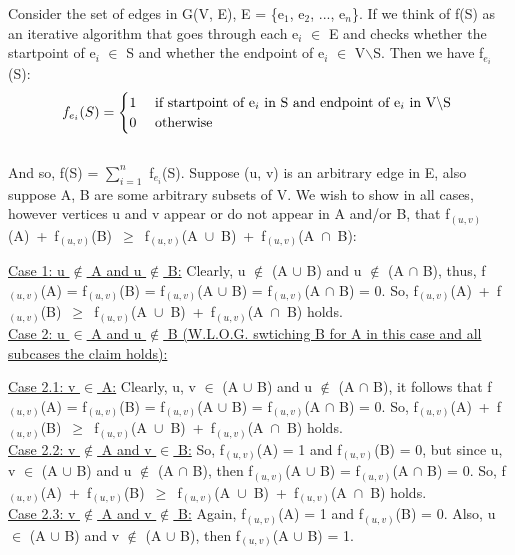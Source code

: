 \documentclass[10pt]{csc_assignment}
\begin{document}
\begin{description}
Consider the set of edges in G(V, E), E = \{e$_{1}$, e$_{2}$, ..., e$_{n}$\}. If we think of f(S) as an iterative algorithm that goes through each e$_{i}$ $\in$ E and checks whether the startpoint of e$_{i}$ $\in$ S and whether the endpoint of e$_{i}$ $\in$ V$\backslash$S. Then we have f$_{e_{i}}$(S):\\
\[
 f_{e_{i}}(S) = 
\begin{cases} 
      \hfill 1 \hfill & \text{ if startpoint of e$_{i}$ in S and endpoint of e$_{i}$ in V$\backslash$S  } \\
      \hfill 0 \hfill & \text{ otherwise} \\
  \end{cases}
\]\\
And so, f(S) = $\sum_{i = 1}^{n}$ f$_{e_{i}}$(S). Suppose (u, v) is an arbitrary edge in E, also suppose A, B are some arbitrary subsets of V. We wish to show in all cases, however vertices u and v appear or do not appear in A and/or B, that \mbox{f$_{(u,v)}$(A) + f$_{(u,v)}$(B) $\geqslant$ f$_{(u,v)}$(A $\cup$ B) + f$_{(u,v)}$(A $\cap$ B)}:\\
\hspace*{1cm}\parbox{16cm}{\underline{Case 1: u $\notin$ A and u $\notin$ B:}
Clearly, u $\notin$ (A $\cup$ B) and u $\notin$ (A $\cap$ B), thus, f$_{(u,v)}$(A) = f$_{(u,v)}$(B) = f$_{(u,v)}$(A $\cup$ B) = f$_{(u,v)}$(A $\cap$ B) = 0. So, \mbox{f$_{(u,v)}$(A) + f$_{(u,v)}$(B) $\geqslant$ f$_{(u,v)}$(A $\cup$ B) + f$_{(u,v)}$(A $\cap$ B)} holds.\\
\underline{Case 2: u $\in$ A and u $\notin$ B (W.L.O.G. swtiching B for A in this case and all subcases the claim holds):}\\
\hspace*{1cm}\parbox{15cm}{\underline{Case 2.1: v $\in$ A:}
Clearly, u, v $\in$ (A $\cup$ B) and u $\notin$ (A $\cap$ B), it follows that f$_{(u,v)}$(A) = f$_{(u,v)}$(B) = f$_{(u,v)}$(A $\cup$ B) = f$_{(u,v)}$(A $\cap$ B) = 0. So, \mbox{f$_{(u,v)}$(A) + f$_{(u,v)}$(B) $\geqslant$ f$_{(u,v)}$(A $\cup$ B) + f$_{(u,v)}$(A $\cap$ B)} holds.\\
\underline{Case 2.2: v $\notin$ A and v $\in$ B:} So, f$_{(u,v)}$(A)  = 1 and f$_{(u,v)}$(B) = 0, but since u, v $\in$ (A $\cup$ B) and u $\notin$ (A $\cap$ B), then f$_{(u,v)}$(A $\cup$ B) = f$_{(u,v)}$(A $\cap$ B) = 0. So, \mbox{f$_{(u,v)}$(A) + f$_{(u,v)}$(B) $\geqslant$ f$_{(u,v)}$(A $\cup$ B) + f$_{(u,v)}$(A $\cap$ B)} holds.\\
\underline{Case 2.3: v $\notin$ A and v $\notin$ B:} Again, f$_{(u,v)}$(A)  = 1 and f$_{(u,v)}$(B) = 0. Also, u $\in$ (A $\cup$ B) and v $\notin$ (A $\cup$ B), then f$_{(u,v)}$(A $\cup$ B) = 1.
}}
\end{description}
\end{document}

